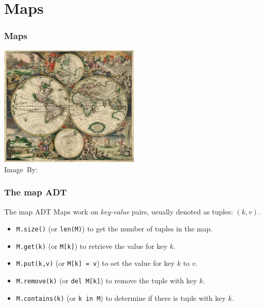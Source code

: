 \section{Maps}%
\label{sec:maps}

\begin{frame}
	\frametitle{Maps}
	
	\begin{center}
		\includegraphics[width=0.5\textwidth]{figures/world_map.JPG}\\
		\hspace*{15pt}\hbox{\scriptsize Image By:}
	\end{center}
\end{frame}

\begin{frame}
	\frametitle{The map ADT}
	
		\begin{block}{The map ADT}
			Maps work on \textit{key-value} pairs, usually denoted as tuples: $(k,v)$.
			\pause
			\begin{itemize}
				\item \texttt{M.size()} (or \texttt{len(M)}) to get the number of tuples in the map.
					\pause
				\item \texttt{M.get(k)} (or \texttt{M[k]}) to retrieve the value for key $k$.
				\item \texttt{M.put(k,v)} (or \texttt{M[k] = v}) to set the value for key $k$ to $v$.
					\pause
				\item \texttt{M.remove(k)} (or \texttt{del M[k]}) to remove the tuple with key $k$.
					\pause
				\item \texttt{M.contains(k)} (or \texttt{k in M}) to determine if there is tuple with key $k$.
			\end{itemize}
		\end{block}	
\end{frame}

